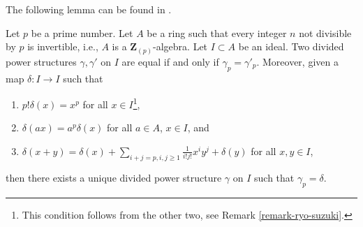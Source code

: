 \noindent
The following lemma can be found in \cite{BO}.

\begin{lemma}
\label{lemma-need-only-gamma-p}
Let $p$ be a prime number. Let $A$ be a ring such that every integer $n$
not divisible by $p$ is invertible, i.e., $A$ is a $\mathbf{Z}_{(p)}$-algebra.
Let $I \subset A$ be an ideal. Two divided power structures
$\gamma, \gamma'$ on $I$ are equal if and only if $\gamma_p = \gamma'_p$.
Moreover, given a map $\delta : I \to I$ such that
\begin{enumerate}
\item $p!\delta(x) = x^p$ for all $x \in I$\footnote{This condition
follows from the other two, see Remark \ref{remark-ryo-suzuki}.},
\item $\delta(ax) = a^p\delta(x)$ for all $a \in A$, $x \in I$, and
\item
$\delta(x + y) =
\delta(x) +
\sum\nolimits_{i + j = p, i,j \geq 1} \frac{1}{i!j!} x^i y^j +
\delta(y)$ for all $x, y \in I$,
\end{enumerate}
then there exists a unique divided power structure $\gamma$ on $I$ such
that $\gamma_p = \delta$.
\end{lemma}

